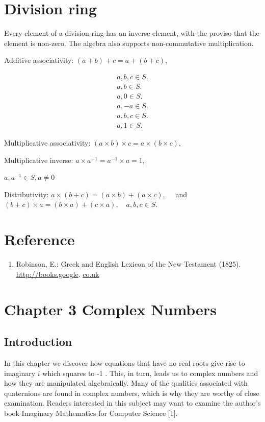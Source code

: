 \documentclass[10pt]{article}
\begin{document}
\section{Division ring}
Every element of a division ring has an inverse element, with the proviso that the element is non-zero. The algebra also supports non-commutative multiplication.

Additive associativity: $(a+b)+c=a+(b+c)$,

$$
\begin{array}{r}
a, b, c \in S . \\
a, b \in S . \\
a, 0 \in S . \\
a,-a \in S . \\
a, b, c \in S . \\
a, 1 \in S .
\end{array}
$$

Multiplicative associativity: $(a \times b) \times c=a \times(b \times c)$,

Multiplicative inverse: $a \times a^{-1}=a^{-1} \times a=1$,

$a, a^{-1} \in S, a \neq 0$

Distributivity: $a \times(b+c)=(a \times b)+(a \times c), \quad$ and $(b+c) \times a=(b \times a)+(c \times a), \quad a, b, c \in S$.

\section{Reference}
\begin{enumerate}
  \item Robinson, E.: Greek and English Lexicon of the New Testament (1825). \href{http://books.google}{http://books.google}. \href{http://co.uk}{co.uk}
\end{enumerate}

\section{Chapter 3
Complex Numbers}
\subsection{Introduction}
In this chapter we discover how equations that have no real roots give rise to imaginary $i$ which squares to -1 . This, in turn, leads us to complex numbers and how they are manipulated algebraically. Many of the qualities associated with quaternions are found in complex numbers, which is why they are worthy of close examination. Readers interested in this subject may want to examine the author's book Imaginary Mathematics for Computer Science [1].
\end{document}
